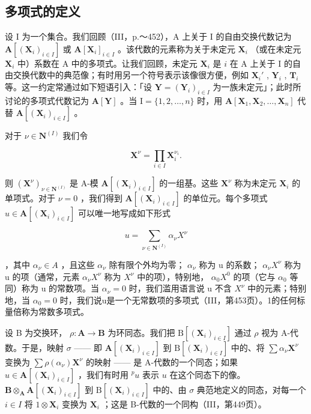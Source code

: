 \subsection{多项式的定义}

设 I 为一个集合。我们回顾（III，p.～452），A 上关于 I 的自由交换代数记为 \(\mathbf{A}[(\mathbf{X}_i)_{i\in I}]\) 或 \(\mathbf{A}[\mathbf{X}_i]_{i\in I}\) 。该代数的元素称为关于未定元 \(\mathbf{X}_i\) （或在未定元 \(\mathbf{X}_i\) 中）系数在 A 中的多项式。让我们回顾，未定元 \(\mathbf{X}_i\) 是 \(i\) 在 A 上关于 I 的自由交换代数中的典范像；有时用另一个符号表示该像很方便，例如 \(\mathbf{X}_i'\) , \(\mathbf{Y}_i\) , \(\mathbf{T}_i\) 等。这一约定常通过如下短语引入：「设 \(\mathbf{Y} = (\mathbf{Y}_i)_{i\in I}\) 为一族未定元」；此时所讨论的多项式代数记为 \(\mathbf{A}[\mathbf{Y}]\) 。当 \(\mathrm{I} = \{1,2,\dots,n\}\) 时，用 \(\mathbf{A}[\mathbf{X}_1,\mathbf{X}_2,\dots,\mathbf{X}_n]\) 代替 \(\mathbf{A}[(\mathbf{X}_i)_{i\in I}]\) 。

对于 \(\nu \in \mathbf{N}^{(I)}\) 我们令

\[
\mathbf {X} ^ {\nu} = \prod_ {i \in I} \mathbf {X} _ {i} ^ {\nu_ {i}}.
\]

则 \((\mathbf{X}^{\nu})_{\nu \in \mathbf{N}^{(I)}}\) 是 A-模 \(\mathbf{A}[(\mathbf{X}_i)_{i\in I}]\) 的一组基。这些 \(\mathbf{X}^{\nu}\) 称为未定元 \(\mathbf{X}_i\) 的单项式。对于 \(\nu = 0\) ，我们得到 \(\mathbf{A}[(\mathbf{X}_i)_{i\in I}]\) 的单位元。每个多项式 \(u\in \mathbf{A}[(\mathbf{X}_i)_{i\in I}]\) 可以唯一地写成如下形式

\[
u = \sum_ {\nu \in \mathbf {N} ^ {(I)}} \alpha_ {\nu} X ^ {\nu}
\]

，其中 \(\alpha_{\nu}\in A\) ，且这些 \(\alpha_{\nu}\) 除有限个外均为零； \(\alpha_{\nu}\) 称为 u 的系数； \(\alpha_{\nu}X^{\nu}\) 称为 u 的项（通常，元素 \(\alpha_{\nu}X^{\nu}\) 称为 \(X^{\nu}\) 中的项），特别地， \(\alpha_{0}X^{0}\) 的项（它与 \(\alpha_{0}\) 等同）称为 u 的常数项。当 \(\alpha_{\nu}=0\) 时，我们滥用语言说 u 不含 \(X^{\nu}\) 中的元素；特别地，当 \(\alpha_{0}=0\) 时，我们说u是一个无常数项的多项式（III，第453页）。1的任何标量倍称为常数多项式。

设 B 为交换环， \(\rho: \mathbf{A} \to \mathbf{B}\) 为环同态。我们把 \(\mathrm{B}[(\mathbf{X}_i)_{i \in I}]\) 通过 \(\rho\) 视为 A-代数。于是，映射 \(\sigma\) —— 即 \(\mathbf{A}[(\mathbf{X}_i)_{i \in I}]\) 到 \(\mathrm{B}[(\mathbf{X}_i)_{i \in I}]\) 中的、将 \(\sum \alpha_\nu \mathbf{X}^\nu\) 变换为 \(\sum \rho(\alpha_\nu) \mathbf{X}^\nu\) 的映射 —— 是 A-代数的一个同态；如果 \(u \in \mathbf{A}[(\mathbf{X}_i)_{i \in I}]\) ，我们有时用 \(^p u\) 表示 \(u\) 在这个同态下的像。 \(\mathbf{B} \otimes_{\mathbf{A}} \mathbf{A}[(\mathbf{X}_i)_{i \in I}]\) 到 \(\mathrm{B}[(\mathbf{X}_i)_{i \in I}]\) 中的、由 \(\sigma\) 典范地定义的同态，对每一个 \(i \in I\) 将 \(1 \otimes \mathbf{X}_i\) 变换为 \(\mathbf{X}_i\) ；这是 B-代数的一个同构（III，第449页）。

